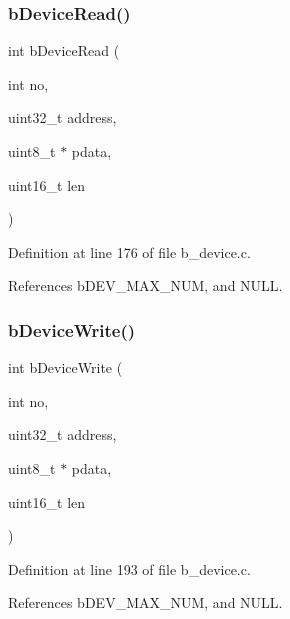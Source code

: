 \subsubsection{\texorpdfstring{b\+Device\+Read()}{bDeviceRead()}}
{\footnotesize\ttfamily int b\+Device\+Read (\begin{DoxyParamCaption}\item[{int}]{no,  }\item[{uint32\+\_\+t}]{address,  }\item[{uint8\+\_\+t $\ast$}]{pdata,  }\item[{uint16\+\_\+t}]{len }\end{DoxyParamCaption})}



Definition at line 176 of file b\+\_\+device.\+c.



References b\+D\+E\+V\+\_\+\+M\+A\+X\+\_\+\+N\+UM, and N\+U\+LL.

\mbox{\label{group___d_e_v_i_c_e___exported___functions_ga7b100bfb070e715961c0bfe2da20d6be}} 
\subsubsection{\texorpdfstring{b\+Device\+Write()}{bDeviceWrite()}}
{\footnotesize\ttfamily int b\+Device\+Write (\begin{DoxyParamCaption}\item[{int}]{no,  }\item[{uint32\+\_\+t}]{address,  }\item[{uint8\+\_\+t $\ast$}]{pdata,  }\item[{uint16\+\_\+t}]{len }\end{DoxyParamCaption})}



Definition at line 193 of file b\+\_\+device.\+c.



References b\+D\+E\+V\+\_\+\+M\+A\+X\+\_\+\+N\+UM, and N\+U\+LL.


